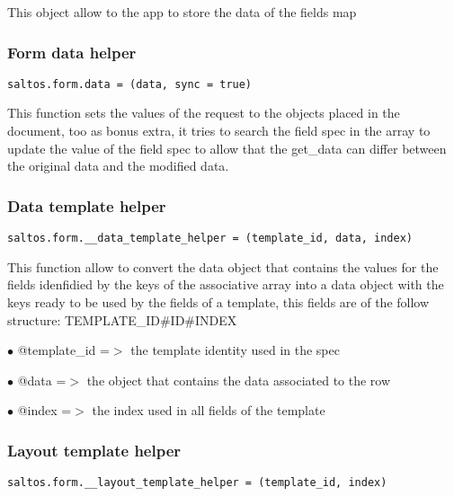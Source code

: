 \documentclass[a4paper]{article}
\begin{document}
This object allow to the app to store the data of the fields map

\hypertarget{toc776}{}
\subsubsection{Form data helper}

\begin{lstlisting}
saltos.form.data = (data, sync = true)
\end{lstlisting}

This function sets the values of the request to the objects placed in the document, too as bonus
extra, it tries to search the field spec in the array to update the value of the field spec to
allow that the get\_data can differ between the original data and the modified data.

\hypertarget{toc777}{}
\subsubsection{Data template helper}

\begin{lstlisting}
saltos.form.__data_template_helper = (template_id, data, index)
\end{lstlisting}

This function allow to convert the data object that contains the values for the fields idenfidied
by the keys of the associative array into a data object with the keys ready to be used by the
fields of a template, this fields are of the follow structure: TEMPLATE\_ID\#ID\#INDEX

\begin{compactitem}
\item[\color{myblue}$\bullet$] @template\_id =$>$ the template identity used in the spec
\item[\color{myblue}$\bullet$] @data        =$>$ the object that contains the data associated to the row
\item[\color{myblue}$\bullet$] @index       =$>$ the index used in all fields of the template
\end{compactitem}

\hypertarget{toc778}{}
\subsubsection{Layout template helper}

\begin{lstlisting}
saltos.form.__layout_template_helper = (template_id, index)
\end{lstlisting}
\end{document}
